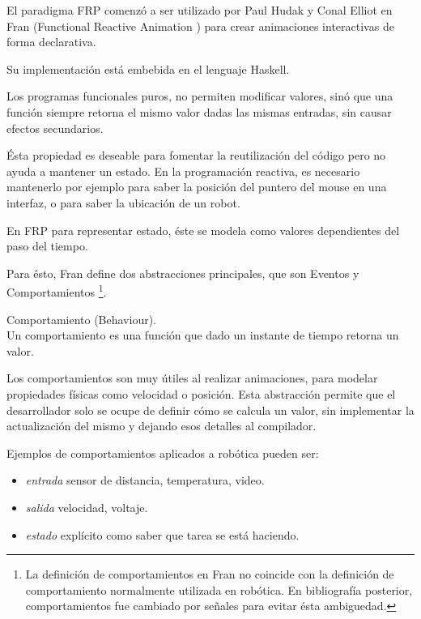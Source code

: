 

El paradigma FRP comenzó a ser utilizado por Paul Hudak y Conal Elliot en
Fran (Functional Reactive Animation \cite{ElliottHudak97:Fran})
para crear animaciones interactivas de forma declarativa.

Su implementación está embebida en el lenguaje Haskell.

Los programas funcionales puros, no permiten modificar valores,
sinó que una función siempre retorna el mismo valor dadas las mismas
entradas, sin causar efectos secundarios.

Ésta propiedad es deseable para fomentar la reutilización del código
pero no ayuda a mantener un estado.
En la programación reactiva, es necesario mantenerlo por
ejemplo para saber la posición del puntero del mouse en una interfaz,
o para saber la ubicación de un robot.

En FRP para representar estado, éste se modela como valores dependientes
del paso del tiempo.

Para ésto, Fran define dos abstracciones principales,
que son Eventos y Comportamientos
\footnote{La definición de comportamientos en Fran no coincide con
la definición de comportamiento normalmente utilizada en robótica.
En bibliografía posterior, comportamientos fue cambiado por señales
para evitar ésta ambiguedad.}.

\begin{definicion}
  Comportamiento (Behaviour).\\

  Un comportamiento es una función que dado un instante de tiempo
  retorna un valor.


\end{definicion}

  Los comportamientos son muy útiles al realizar animaciones,
para modelar propiedades físicas como velocidad o posición.
  Esta abstracción permite que el desarrollador solo se ocupe de
definir cómo se calcula un valor, sin implementar la actualización
del mismo y dejando esos detalles al compilador.

  Ejemplos de comportamientos aplicados a robótica pueden ser:

\begin{itemize}
  \item \textit{entrada} sensor de distancia, temperatura, video.
  \item \textit{salida} velocidad, voltaje.
  \item \textit{estado} explícito como saber que tarea se está haciendo.
\end{itemize}

